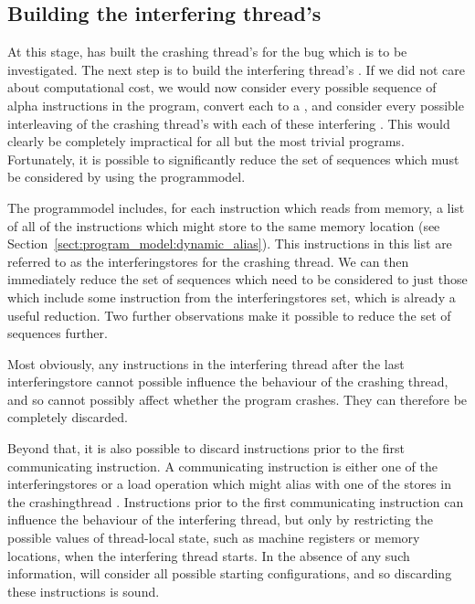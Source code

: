 \subsection{Building the interfering thread's \StateMachines}
\label{sect:derive:write_side}

At this stage, {\technique} has built the crashing thread's
{\StateMachine} for the bug which is to be investigated.  The next
step is to build the interfering thread's {\StateMachine}.  If we did
not care about computational cost, we would now consider every
possible sequence of \gls{alpha} instructions in the program,
convert each to a {\StateMachine}, and consider every possible
interleaving of the crashing thread's {\StateMachine} with each of
these interfering {\StateMachines}.  This would clearly be completely
impractical for all but the most trivial programs.  Fortunately, it is
possible to significantly reduce the set of sequences which must be
considered by using the \gls{programmodel}.

The \gls{programmodel} includes, for each instruction which reads from
memory, a list of all of the instructions which might store to the
same memory location (see
Section~\ref{sect:program_model:dynamic_alias}).  This instructions in
this list are referred to as the \glspl{interferingstore} for the
crashing thread.  We can then immediately reduce the set of sequences
which need to be considered to just those which include some
instruction from the \glspl{interferingstore} set, which is
already a useful reduction.  Two further observations make it possible
to reduce the set of sequences further.

Most obviously, any instructions in the interfering thread after the
last \gls{interferingstore} cannot possible influence the behaviour of
the crashing thread, and so cannot possibly affect whether the program
crashes.  They can therefore be completely discarded.

Beyond that, it is also possible to discard instructions prior to the
first communicating instruction.  A communicating instruction is
either one of the \glspl{interferingstore} or a load operation which
might alias with one of the stores in the \gls{crashingthread}
{\StateMachine}.  Instructions prior to the first communicating
instruction can influence the behaviour of the interfering thread, but
only by restricting the possible values of thread-local state, such as
machine registers or memory locations, when the interfering thread
starts.  In the absence of any such information, {\technique} will
consider all possible starting configurations, and so discarding these
instructions is sound.

